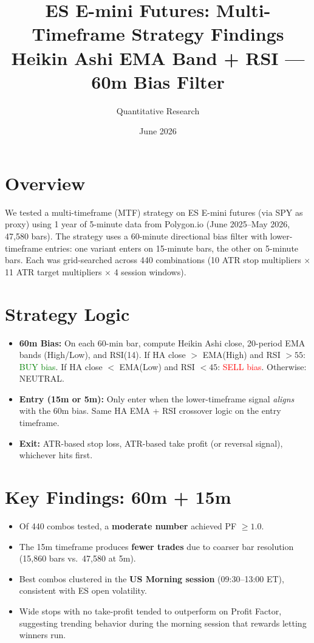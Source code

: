 \documentclass[11pt]{article}
\title{ES E-mini Futures: Multi-Timeframe Strategy Findings\\[0.3em]
\large Heikin Ashi EMA Band + RSI --- 60m Bias Filter}
\author{Quantitative Research}
\date{June 2026}
\begin{document}
\maketitle

\section*{Overview}
We tested a multi-timeframe (MTF) strategy on ES E-mini futures (via SPY as proxy) using 1 year of 5-minute data from Polygon.io (June 2025--May 2026, 47{,}580 bars). The strategy uses a 60-minute directional bias filter with lower-timeframe entries: one variant enters on 15-minute bars, the other on 5-minute bars. Each was grid-searched across 440 combinations (10 ATR stop multipliers $\times$ 11 ATR target multipliers $\times$ 4 session windows).

\section*{Strategy Logic}
\begin{itemize}[leftmargin=1.5em]
    \item \textbf{60m Bias:} On each 60-min bar, compute Heikin Ashi close, 20-period EMA bands (High/Low), and RSI(14). If HA close $>$ EMA(High) and RSI $> 55$: \textcolor{green}{BUY bias}. If HA close $<$ EMA(Low) and RSI $< 45$: \textcolor{red}{SELL bias}. Otherwise: NEUTRAL.
    \item \textbf{Entry (15m or 5m):} Only enter when the lower-timeframe signal \emph{aligns} with the 60m bias. Same HA EMA + RSI crossover logic on the entry timeframe.
    \item \textbf{Exit:} ATR-based stop loss, ATR-based take profit (or reversal signal), whichever hits first.
\end{itemize}

\section*{Key Findings: 60m + 15m}
\begin{itemize}[leftmargin=1.5em]
    \item Of 440 combos tested, a \textbf{moderate number} achieved PF $\geq 1.0$.
    \item The 15m timeframe produces \textbf{fewer trades} due to coarser bar resolution (15{,}860 bars vs.\ 47{,}580 at 5m).
    \item Best combos clustered in the \textbf{US Morning session} (09:30--13:00 ET), consistent with ES open volatility.
    \item Wide stops with no take-profit tended to outperform on Profit Factor, suggesting trending behavior during the morning session that rewards letting winners run.
\end{itemize}
\end{document}
